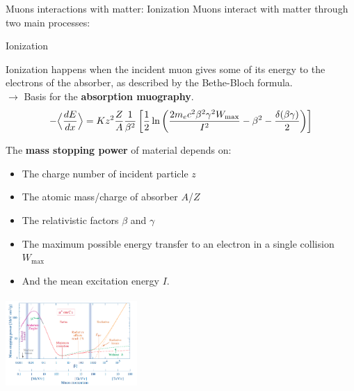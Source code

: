 \documentclass[handout,8 pt]{beamer}
\begin{document}
\begin{frame}{Muons interactions with matter: Ionization}
\justifying
Muons interact with matter through two main processes:
\begin{exampleblock}{} Ionization \end{exampleblock}
\justifying
Ionization happens when the incident muon gives some of its energy to the electrons of the absorber, as described by the Bethe-Bloch formula.
\\
\hspace{10pt} $\rightarrow$ Basis for the \textbf{\alert{absorption muography}}.\vfill
\begin{equation*}
\label{eq:BB}
- \Bigl \langle \frac{dE}{dx} \Bigr \rangle = K z^2 \frac{Z}{A} \frac{1}{\beta^2} \left [\frac{1}{2} \ln \left (\frac{2 m_e c^2 \beta^2 \gamma^2 W_{\text{max}}}{I^2} - \beta^2 - \frac{\delta(\beta \gamma)}{2} \right ) \right ]
\end{equation*} \vfill

\begin{minipage}[c]{.58\textwidth}
The \textbf{mass stopping power} of material depends on:
\begin{itemize}
	\item The charge number of incident particle $z$
	\item The atomic mass/charge of absorber $A$/$Z$
	\item The relativistic factors $\beta$ and $\gamma$
	\item The maximum possible energy transfer to an electron in a single collision $W_{\text{max}}$
	\item And the mean excitation energy $I$.
\end{itemize} \vfill
\end{minipage}
\begin{minipage}[c]{.38\textwidth}
	\includegraphics[width=5cm, height=3.5cm]{figs/BB.png}
\end{minipage}
\end{frame}
\end{document}
